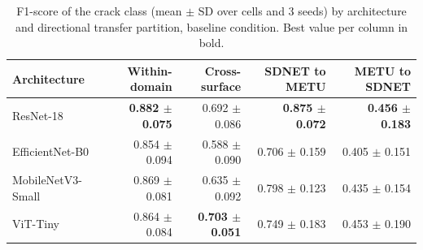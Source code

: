 \begin{table}[htbp]
\centering
\caption{F1-score of the crack class (mean $\pm$ SD over cells and 3 seeds) by architecture and directional transfer partition, baseline condition. Best value per column in bold.}
\label{tab:f1-particion}
\begin{tabular}{lrrrr}
\toprule
Architecture & Within-domain & Cross-surface & SDNET to METU & METU to SDNET \\
\midrule
ResNet-18 & \textbf{0.882 $\pm$ 0.075} & 0.692 $\pm$ 0.086 & \textbf{0.875 $\pm$ 0.072} & \textbf{0.456 $\pm$ 0.183} \\
EfficientNet-B0 & 0.854 $\pm$ 0.094 & 0.588 $\pm$ 0.090 & 0.706 $\pm$ 0.159 & 0.405 $\pm$ 0.151 \\
MobileNetV3-Small & 0.869 $\pm$ 0.081 & 0.635 $\pm$ 0.092 & 0.798 $\pm$ 0.123 & 0.435 $\pm$ 0.154 \\
ViT-Tiny & 0.864 $\pm$ 0.084 & \textbf{0.703 $\pm$ 0.051} & 0.749 $\pm$ 0.183 & 0.453 $\pm$ 0.190 \\
\bottomrule
\end{tabular}
\end{table}
